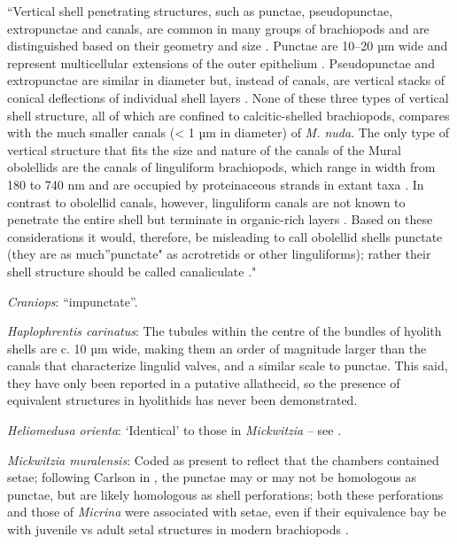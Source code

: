 \documentclass[openany]{book}
\theoremstyle{definition}
\theoremstyle{definition}
\theoremstyle{definition}
\theoremstyle{remark}
\begin{document}
``Vertical shell penetrating structures, such as punctae, pseudopunctae,
extropunctae and canals, are common in many groups of brachiopods and
are distinguished based on their geometry and size
\citep{Williams1997Introduction}. Punctae are 10--20 µm wide and
represent multicellular extensions of the outer epithelium
\citep{Owen1969Thecaecum}. Pseudopunctae and extropunctae are similar in
diameter but, instead of canals, are vertical stacks of conical
deflections of individual shell layers \citep{Williams1993Roleof}. None
of these three types of vertical shell structure, all of which are
confined to calcitic-shelled brachiopods, compares with the much smaller
canals (\textless{} 1 µm in diameter) of \emph{M. nuda}. The only type
of vertical structure that fits the size and nature of the canals of the
Mural obolellids are the canals of linguliform brachiopods, which range
in width from 180 to 740 nm and are occupied by proteinaceous strands in
extant taxa
\citep{Williams1992Structureof, Williams1994Collagenouschitino, Williams1997Introduction}.
In contrast to obolellid canals, however, linguliform canals are not
known to penetrate the entire shell but terminate in organic-rich layers
\citep{Williams1997Introduction}. Based on these considerations it
would, therefore, be misleading to call obolellid shells punctate (they
are as much''punctate" as acrotretids or other linguliforms); rather
their shell structure should be called canaliculate
\citep{Williams1997Introduction}."

\hypertarget{Craniops-coding-63}{}
\emph{Craniops}: ``impunctate''.

\hypertarget{Haplophrentis_carinatus-coding-63}{}
\emph{Haplophrentis carinatus}: The tubules within the centre of the
bundles of hyolith shells \citep{Kouchinsky2000Skeletalmicrostructures}
are c. 10 µm wide, making them an order of magnitude larger than the
canals that characterize lingulid valves, and a similar scale to
punctae. This said, they have only been reported in a putative
allathecid, so the presence of equivalent structures in hyolithids has
never been demonstrated.

\hypertarget{Heliomedusa_orienta-coding-63}{}
\emph{Heliomedusa orienta}: `Identical' to those in \emph{Mickwitzia} --
see \citet{Williams2007Supplement}.

\hypertarget{Mickwitzia_muralensis-coding-63}{}
\emph{Mickwitzia muralensis}: Coded as present to reflect that the
chambers contained setae; following Carlson in
\citet{Williams2007Supplement}, the punctae may or may not be homologous
as punctae, but are likely homologous as shell perforations; both these
perforations and those of \emph{Micrina} were associated with setae,
even if their equivalence bay be with juvenile vs adult setal structures
in modern brachiopods \citep[p.~397]{Balthasar2004Shellstructure}.
\end{document}
